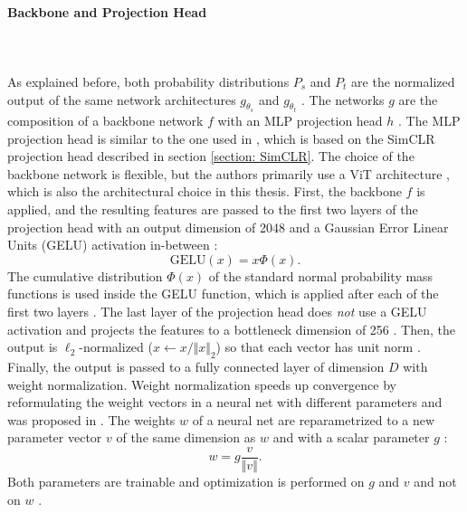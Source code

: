 \paragraph{Backbone and Projection Head} \mbox{} \\
\\
As explained before, both probability distributions $P_s$ and $P_t$ are the normalized output of the same network architectures $g_{\theta_s}$ and $g_{\theta_t}$ \citep{Caron2021}.
The networks $g$ are the composition of a backbone network $f$ with an MLP projection head $h$ \citep{Caron2021}.
The MLP projection head is similar to the one used in \citep{Caron2020}, which is based on the SimCLR projection head described in section \ref{section: SimCLR}.
The choice of the backbone network is flexible, but the authors primarily use a ViT architecture \citep{Dosovitskiy2020}, which is also the architectural choice in this thesis.
First, the backbone $f$ is applied, and the resulting features are passed to the first two layers of the projection head with an output dimension of 2048 and a Gaussian Error Linear Units (GELU) activation in-between \citep{Hendrycks2016b}:
\begin{equation}
\text{GELU}(x) = x \Phi(x).
\end{equation}
The cumulative distribution $\Phi(x)$ of the standard normal probability mass functions is used inside the GELU function, which is applied after each of the first two layers \citep{Hendrycks2016b}.
The last layer of the projection head does \textit{not} use a GELU activation and projects the features to a bottleneck dimension of 256 \citep{Caron2021}.
Then, the output is $\ell_2$-normalized ($x \leftarrow x/\Vert x \Vert_2$) so that each vector has unit norm \citep{Caron2021}.
Finally, the output is passed to a fully connected layer of dimension $D$ with weight normalization.
Weight normalization speeds up convergence by reformulating the weight vectors in a neural net with different parameters and was proposed in \citep{Salimans2016}.
The weights $w$ of a neural net are reparametrized to a new parameter vector $v$ of the same dimension as $w$ and with a scalar parameter $g$ \citep{Salimans2016}:
\begin{equation}
	w = g \frac{v}{\Vert v \Vert}.
\end{equation}
Both parameters are trainable and optimization is performed on $g$ and $v$ and not on $w$ \citep{Salimans2016}.
